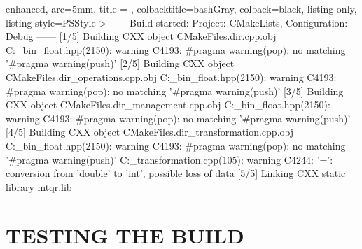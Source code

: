 \documentclass[a4paper, twosided]{book}
\begin{document}
\vspace{0.2cm}
\begin{tcblisting}{enhanced,
                   arc=5mm,
                   title = \color{black}{\large \ttfamily Compiling the static library target},
                   colbacktitle=bashGray,
                   colback=black,
                   listing only,
                   listing style=PSStyle}
>------ Build started: Project: CMakeLists, Configuration: Debug ------
  [1/5] Building CXX object CMakeFiles\mtqr.dir\src\mtqr.cpp.obj
C:\boost\boost\multiprecision\cpp_bin_float.hpp(2150): warning C4193: #pragma warning(pop): no matching '#pragma warning(push)'
  [2/5] Building CXX object CMakeFiles\mtqr.dir\src\vector_operations.cpp.obj
C:\boost\boost\multiprecision\cpp_bin_float.hpp(2150): warning C4193: #pragma warning(pop): no matching '#pragma warning(push)'
  [3/5] Building CXX object CMakeFiles\mtqr.dir\src\data_management.cpp.obj
C:\boost\boost\multiprecision\cpp_bin_float.hpp(2150): warning C4193: #pragma warning(pop): no matching '#pragma warning(push)'
  [4/5] Building CXX object CMakeFiles\mtqr.dir\src\monomial_transformation.cpp.obj
C:\boost\boost\multiprecision\cpp_bin_float.hpp(2150): warning C4193: #pragma warning(pop): no matching '#pragma warning(push)'
C:\MTQR\src\monomial_transformation.cpp(105): warning C4244: '=': conversion from 'double' to 'int', possible loss of data
  [5/5] Linking CXX static library mtqr.lib
\end{tcblisting}
\vspace{0.3cm}

\section[Testing the build]{\changefont TESTING THE BUILD}\label{Sec2.4}
\end{document}
